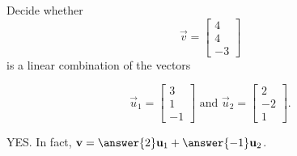 \documentclass{ximera}
\begin{document}
\begin{problem}\label{prb:3.3}
Decide whether
\begin{equation*}
\vec{v}= 
\begin{bmatrix}
4 \\
4 \\
-3
\end{bmatrix}
\end{equation*}
is a linear combination of the vectors

\begin{equation*}
\vec{u}_1 = 
\begin{bmatrix}
3 \\
1 \\
-1
\end{bmatrix}
\mbox{ and  }
\vec{u}_2 =
\begin{bmatrix}
2 \\
-2\\
1
\end{bmatrix}.
\end{equation*}

\begin{hint}
YES.  In fact, $\vec{v}=\answer{2}\vec{u}_1 +\answer{-1}\vec{u}_2$.
\end{hint}
\end{problem}
\end{document}
